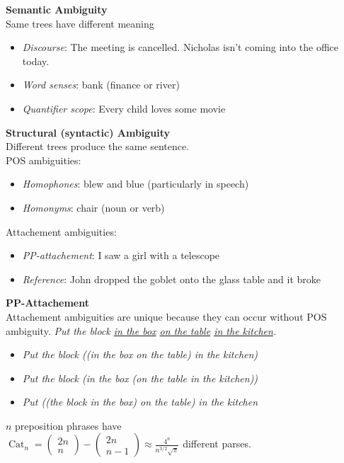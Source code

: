 \documentclass[8pt]{extarticle} %
\begin{document}
\begin{multicols*}{3}
\textbf{Semantic Ambiguity}\\
Same trees have different meaning
\begin{itemize}[label=\textbullet, labelsep=0.3em, leftmargin=0.5em, itemsep=0em]
    \item \textit{Discourse}: The meeting is cancelled. Nicholas isn't coming into the office today.
    \item \textit{Word senses}: bank (finance or river)
    \item \textit{Quantifier scope}: Every child loves some movie
\end{itemize}

\textbf{Structural (syntactic) Ambiguity}\\
Different trees produce the same sentence. \\
POS ambiguities:
\begin{itemize}[label=\textbullet, labelsep=0.3em, leftmargin=0.5em, itemsep=0em]
    \item \textit{Homophones}: blew and blue (particularly in speech)
    \item \textit{Homonyms}: chair (noun or verb)
\end{itemize}
Attachement ambiguities:
\begin{itemize}[label=\textbullet, labelsep=0.3em, leftmargin=0.5em, itemsep=0em]
    \item \textit{PP-attachement}: I saw a girl with a telescope
    \item \textit{Reference}: John dropped the goblet onto the glass table and it broke
\end{itemize}

\textbf{PP-Attachement}\\
Attachement ambiguities are unique because they can occur without POS ambiguity. 
\textit{Put the block \underline{in the box} \underline{on the table} \underline{in the kitchen}.}
\begin{itemize}[label=\textbullet, labelsep=0.3em, leftmargin=0.5em, itemsep=0em]
\item \textit{Put the block ((in the box on the table) in the kitchen)}
\item \textit{Put the block (in the box (on the table in the kitchen))}
\item \textit{Put ((the block in the box) on the table) in the kitchen}
\end{itemize}
$n$ preposition phrases have \\$\operatorname{Cat}_n = \left(\begin{array}{c}2 n \\ n\end{array}\right)-\left(\begin{array}{c}2 n \\ n-1\end{array}\right) \approx \frac{4^n}{n^{3 / 2} \sqrt{\pi}}$ different parses.\\


\end{multicols*}
\end{document}
